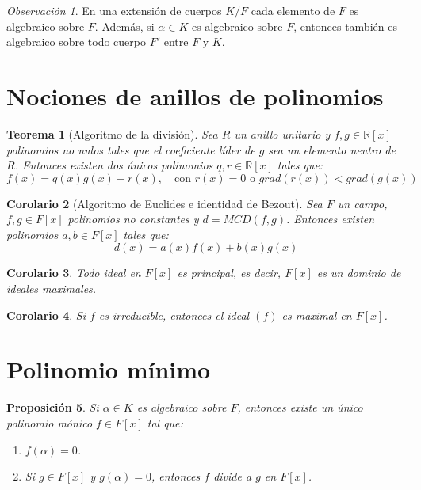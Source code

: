 \documentclass{report}
\newtheorem{theorem}{Teorema}[chapter]
\newtheorem{corollary}[theorem]{Corolario}
\newtheorem{proposition}[theorem]{Proposición}
\theoremstyle{remark}
\newtheorem*{remark}{Observación}
\theoremstyle{definition}
\theoremstyle{definition}
\theoremstyle{definition}
\begin{document}
\begin{remark}
    En una extensión de cuerpos $K/F$ cada elemento de $F$ es algebraico sobre $F$.
    Además, si $\alpha \in K$ es algebraico sobre $F$, entonces también es algebraico sobre todo cuerpo $F'$ entre $F$ y $K$.
\end{remark}

\section{Nociones de anillos de polinomios}

\begin{theorem}[Algoritmo de la división]
    Sea $R$ un anillo unitario y $f, g \in \mathbb{R}[x]$ polinomios no nulos tales que el coeficiente líder de $g$ sea un elemento neutro de $R$.
    Entonces existen dos únicos polinomios $q, r \in \mathbb{R}[x]$ tales que:
    $$f(x) = q(x)g(x) + r(x), \quad\text{con } r(x)=0 \text{ o } grad(r(x)) < grad(g(x))$$
\end{theorem}

\begin{corollary}[Algoritmo de Euclides e identidad de Bezout]
    Sea $F$ un campo, $f, g \in F[x]$ polinomios no constantes y $d = MCD(f, g)$. Entonces existen polinomios $a, b \in F[x]$ tales que:
    $$d(x) = a(x)f(x) + b(x)g(x)$$
\end{corollary}

\begin{corollary}
    Todo ideal en $F[x]$ es principal, es decir, $F[x]$ es un dominio de ideales maximales.
\end{corollary}

\begin{corollary}
    Si $f$ es irreducible, entonces el ideal $(f)$ es maximal en $F[x]$.
\end{corollary}

\section{Polinomio mínimo}

\begin{proposition}
    Si $\alpha \in K$ es algebraico sobre $F$, entonces existe un único polinomio mónico $f \in F[x]$ tal que:
    \begin{enumerate}
        \item $f(\alpha) = 0$.
        \item Si $g \in F[x]$ y $g(\alpha) = 0$, entonces $f$ divide a $g$ en $F[x]$.
    \end{enumerate}
\end{proposition}
\end{document}
